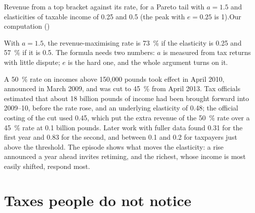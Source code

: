 \begin{omchart}{Revenue from a top bracket against its rate, for a Pareto tail with
$a = 1.5$ and elasticities of taxable income of 0.25 and 0.5 (the peak with $e = 0.25$
is 1).}{Our computation ()}
\end{omchart}

With $a = 1.5$, the revenue-maximising rate is 73~\% if the elasticity is 0.25 and 57~\%
if it is 0.5. The formula needs two numbers: $a$ is measured from tax returns with
little dispute; $e$ is the hard one, and the whole argument turns on it.

\begin{record}
A 50~\% rate on incomes above 150{,}000 pounds took effect in April 2010, announced
in March 2009, and was cut to 45~\% from April 2013. Tax officials estimated that
about 18 billion pounds of income had been brought forward into 2009--10, before
the rate rose, and an underlying elasticity of 0.48; the official costing of the cut
used 0.45, which put the extra revenue of the 50~\% rate over a 45~\% rate at 0.1
billion pounds. Later work with fuller data found 0.31 for the first year and 0.83
for the second, and between 0.1 and 0.2 for taxpayers just above the threshold.
The episode shows what moves the elasticity: a rise announced a year ahead invites
retiming, and the richest, whose income is most easily shifted, respond most.
\end{record}

\section{Taxes people do not notice}\label{sec:b3:efficiency-cost-of-taxation:salience}

